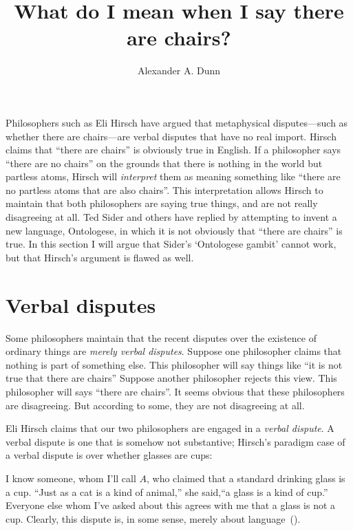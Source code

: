 \documentclass[11pt]{article}
\title{What do I mean when I say there are chairs?}
\author{Alexander A. Dunn}
\newenvironment{squote}{%
\begin{spacing}{1}
       	\begin{list}{}{%
\setlength{\labelwidth}{0pt}%
\rightmargin\leftmargin%
}
\item\relax
}{%
\end{list}%
\end{spacing}
}
\begin{document}
\ifstandalone
\maketitle
\begin{spacing}{1.25}
\fi

\label{verbal}
Philosophers such as Eli Hirsch have argued that metaphysical
disputes---such as whether there are chairs---are verbal disputes that
have no real import.  Hirsch claims that ``there are chairs'' is
obviously true in English.  If a philosopher says ``there are no
chairs'' on the grounds that there is nothing in the world but
partless atoms, Hirsch will {\em interpret} them as meaning something
like ``there are no partless atoms that are also chairs''.  This
interpretation allows Hirsch to maintain that both philosophers are
saying true things, and are not really disagreeing at all.  Ted Sider
and others have replied by attempting to invent a new language,
Ontologese, in which it is not obviously that ``there are chairs'' is
true.  In this section I will argue that Sider's `Ontologese gambit'
cannot work, but that Hirsch's argument is flawed as well.

\section{Verbal disputes}
\label{hirsch}
Some philosophers maintain that the recent disputes over the existence
of ordinary things are {\em merely verbal disputes}.  Suppose one
philosopher claims that nothing is part of something else.  This
philosopher will say things like ``it is not true that there are
chairs'' Suppose another philosopher rejects this view.  This
philosopher will says ``there are chairs''.  It seems obvious that
these philosophers are disagreeing.  But according to some, they are
not disagreeing at all.  

Eli Hirsch claims that our two philosophers are engaged in a {\em
  verbal dispute}.  A verbal dispute is one that is somehow not
substantive; Hirsch's paradigm case of a verbal dispute is over
whether glasses are cups:

\begin{squote}
  I know someone, whom I'll call $A$, who claimed that a standard
  drinking glass is a cup.  ``Just as a cat is a kind of animal,'' she
  said,``a glass is a kind of cup.''  Everyone else whom I've asked
  about this agrees with me that a glass is not a cup.  Clearly, this
  dispute is, in some sense, merely about
  language~(\citeyear[69]{hirsch2005}).
\end{squote}


\end{spacing}
\end{document}
